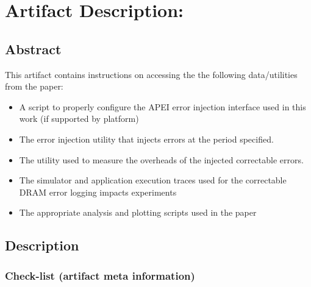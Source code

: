 \clearpage
\appendices
\section{Artifact Description: \myTitle}
\label{sec:appendix}


\subsection{Abstract}

This artifact contains instructions on accessing the the following
data/utilities from the paper:
\begin{itemize}
        \item A script to properly configure the APEI error injection interface
                used in this work (if supported by platform)
        \item The error injection utility that injects errors at the period
                specified.
        \item The \selfish utility used to measure the overheads of the injected
                correctable errors.
        \item The \LogGOPSim simulator and application execution traces used for
                the correctable DRAM error logging impacts  experiments 
        \item The appropriate analysis and plotting scripts used in the paper
\end{itemize}

\subsection{Description}

\subsubsection{Check-list (artifact meta information)}

